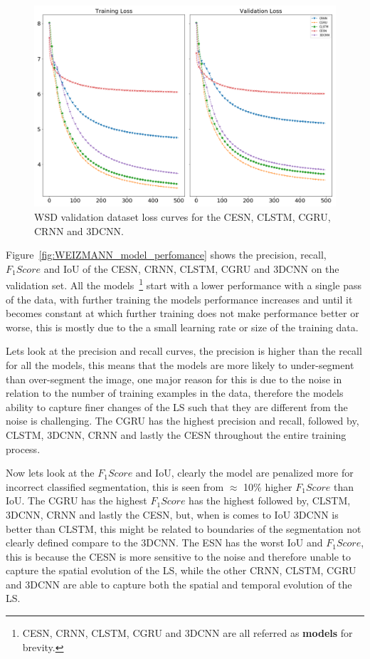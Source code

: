 \documentclass{WitsPhysicsReport}
\begin{document}
\begin{figure}[H]
\centering
  \includegraphics[width=1\textwidth]{Figure/Results/WEIZMANN_loss.png}
 \caption{WSD validation dataset loss curves for the CESN, CLSTM, CGRU, CRNN and 3DCNN.}
 \label{fig:WEIZMANN_model_loss}
\end{figure}

Figure~\ref{fig:WEIZMANN_model_perfomance} shows the precision, recall, $F_{1}Score$ and IoU of the CESN, CRNN, CLSTM, CGRU and 3DCNN on the validation set. All the models~\footnote{CESN, CRNN, CLSTM, CGRU and 3DCNN are all referred as \textbf{models} for brevity.} start with a lower performance with a single pass of the data, with further training the models performance increases and until it becomes constant at which further training does not make performance better or worse, this is mostly due to the a small learning rate or size of the training data.

Lets look at the precision and recall curves, the precision is higher than the recall for all the models, this means that the models are more likely to under-segment than over-segment the image, one major reason for this is due to the noise in relation to the number of training examples in the data, therefore the models ability to capture finer changes of the LS such that they are different from the noise is challenging. The CGRU has the highest precision and recall, followed by, CLSTM, 3DCNN, CRNN and lastly the CESN throughout the entire training process. 

Now lets look at the $F_{1}Score$ and IoU, clearly the model are penalized more for incorrect classified segmentation, this is seen from $\approx$ 10\% higher $F_{1}Score$ than IoU. The CGRU has the highest $F_{1}Score$ has the highest  followed by, CLSTM, 3DCNN, CRNN and lastly the CESN, but, when is comes to IoU 3DCNN is better than CLSTM, this might be related to boundaries of the segmentation not clearly defined compare to the 3DCNN. The ESN has the worst IoU and $F_{1}Score$, this is because the CESN is more sensitive to the noise and therefore unable to capture the spatial evolution of the LS, while the other CRNN, CLSTM, CGRU and 3DCNN are able to capture both the spatial and temporal evolution of the LS.
\end{document}
